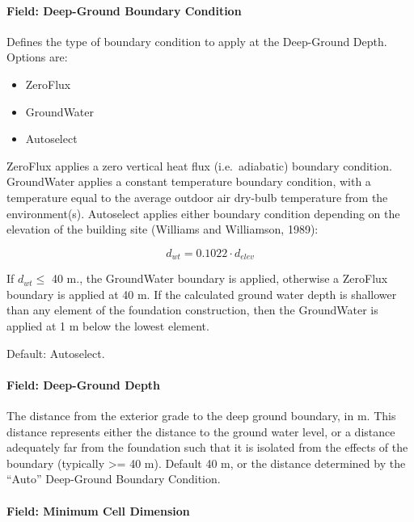\paragraph{Field: Deep-Ground Boundary Condition}\label{foundation-kiva-settings-deep-ground-boundary-condition}

Defines the type of boundary condition to apply at the Deep-Ground
Depth. Options are:

\begin{itemize}
\tightlist
\item
  ZeroFlux
\item
  GroundWater
\item
  Autoselect
\end{itemize}

ZeroFlux applies a zero vertical heat flux (i.e.~adiabatic) boundary
condition. GroundWater applies a constant temperature boundary
condition, with a temperature equal to the average outdoor air dry-bulb
temperature from the environment(s). Autoselect applies either boundary
condition depending on the elevation of the building site (Williams and
Williamson, 1989):

\[d_{wt}=0.1022\cdot d_{elev}\]

If \(d_{wt} \le\) 40 m., the GroundWater boundary is applied, otherwise
a ZeroFlux boundary is applied at 40 m. If the calculated ground water depth is
shallower than any element of the foundation construction, then the GroundWater
is applied at 1 m below the lowest element.

Default: Autoselect.

\paragraph{Field: Deep-Ground Depth}\label{foundation-kiva-settings-deep-ground-depth}

The distance from the exterior grade to the deep ground boundary, in m.
This distance represents either the distance to the ground water level,
or a distance adequately far from the foundation such that it is
isolated from the effects of the boundary (typically \textgreater{}= 40
m). Default 40 m, or the distance determined by the ``Auto'' Deep-Ground
Boundary Condition.

\paragraph{Field: Minimum Cell Dimension}\label{foundation-kiva-settings-minimum-cell-dimension}

